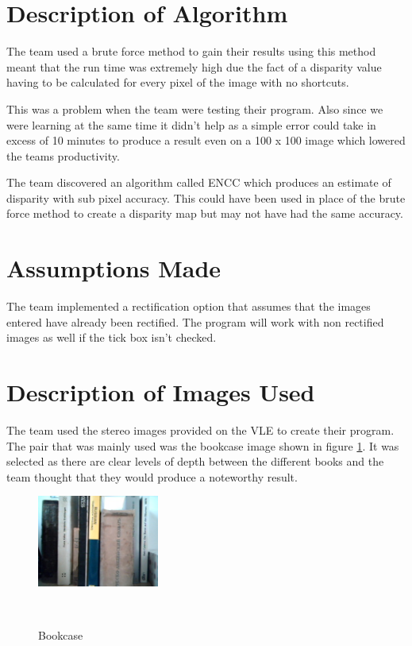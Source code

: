 \documentclass[twocolumn]{article}
\begin{document}
\section{Description of Algorithm}
\vspace{-1ex}

The team used a brute force method to gain their results using this method meant that the run time was extremely high due the fact of a disparity value having to be calculated for every pixel of the image with no shortcuts. 

This was a problem when the team were testing their program. Also since we were learning at the same time it didn't help as a simple error could take in excess of 10 minutes to produce a result even on a 100 x 100 image which lowered the teams productivity. 


The team discovered an algorithm called ENCC \cite{ENCC} which produces an estimate of disparity with sub pixel accuracy. This could have been used in place of the brute force method to create a disparity map but may not have had the same accuracy. 

\section{Assumptions Made}
\vspace{-1ex}

The team implemented a rectification option that assumes that the images entered have already been rectified. The program will work with non rectified images as well if the tick box isn't checked. 



\section{Description of Images Used}
\vspace{-1ex}

The team used the stereo images provided on the VLE to create their program. The pair that was mainly used was the bookcase image shown in figure \ref{fig:testR}. It was selected as there are clear levels of depth between the different books and the team thought that they would produce a noteworthy result. 

\begin{figure}[H]
\centering
  \includegraphics[width=40mm]{Figures/testR}
    \caption{Bookcase}~\label{fig:testR}
\end{figure} 
\end{document}
